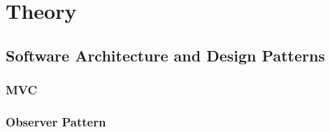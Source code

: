 \chapter{Theory}
\label{chap:theory}



\section{Software Architecture and Design Patterns}
\subsection{MVC}
\subsection{Observer Pattern}




